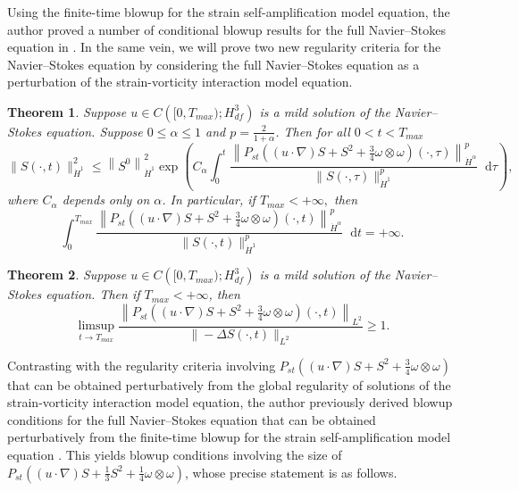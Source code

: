 \documentclass[11pt]{article}
\theoremstyle{plain}
\newtheorem{theorem}{Theorem}[section]
\theoremstyle{remark}
\numberwithin{equation}{section}
\newcommand{\diff}{\mathop{}\!\mathrm{d}}
\begin{document}
Using the finite-time blowup for the strain self-amplification model equation, the author proved a number of conditional blowup results for the full Navier--Stokes equation in \cite{MillerStrainModel}.
In the same vein, we will prove two new regularity criteria for the Navier--Stokes equation by considering the full Navier--Stokes equation as a perturbation of the strain-vorticity interaction model equation.


\begin{theorem} \label{StrainVortPerturbedRegCritIntro}
Suppose $u\in C\left([0,T_{max});H^3_{df}\right)$ is a mild solution of the Navier--Stokes equation.
Suppose $0\leq \alpha \leq 1$ and 
$p=\frac{2}{1+\alpha}$.
Then for all $0<t<T_{max}$
\begin{equation}
    \|S(\cdot,t)\|_{\dot{H}^1}^2
    \leq
    \left\|S^0 \right\|_{\dot{H}^1}^2
    \exp \left( C_\alpha \int_0^t
    \frac{\left\|P_{st}\left((u\cdot\nabla)S +S^2+\frac{3}{4}\omega\otimes\omega\right)
    (\cdot,\tau)\right\|_{\dot{H}^\alpha}^p}
    {\|S(\cdot,\tau)\|_{\dot{H}^1}^p} 
    \diff\tau \right),
\end{equation}
where $C_\alpha$ depends only on $\alpha$.
In particular, if $T_{max}<+\infty,$ then
\begin{equation}
    \int_0^{T_{max}}
    \frac{\left\|P_{st}\left((u\cdot\nabla)S +S^2+\frac{3}{4}\omega\otimes\omega\right)
    (\cdot,t)\right\|_{\dot{H}^\alpha}^p}
    {\|S(\cdot,t)\|_{\dot{H}^1}^p} \diff t 
    =+\infty.
\end{equation}
\end{theorem}



\begin{theorem} \label{EndpointRegCritIntro}
Suppose $u\in C\left([0,T_{max});H^3_{df}\right)$ is a mild solution of the Navier--Stokes equation.
Then if $T_{max}<+\infty$, then
\begin{equation}
    \limsup_{t\to T_{max}}
    \frac{\left\|P_{st}\left((u\cdot\nabla)S
    +S^2+\frac{3}{4}\omega\otimes\omega\right)
    (\cdot,t)\right\|_{L^2}}
    {\|-\Delta S(\cdot,t)\|_{L^2}} \geq 1.
\end{equation}
\end{theorem}


Contrasting with the regularity criteria involving
$P_{st}\left((u\cdot\nabla)S+S^2
+\frac{3}{4}\omega\otimes\omega\right)$
that can be obtained perturbatively from the global regularity of solutions of the strain-vorticity interaction model equation, the author previously derived blowup conditions for the full Navier--Stokes equation that can be obtained perturbatively from the finite-time blowup for the strain self-amplification model equation \cites{MillerStrainModel}. 
This yields blowup conditions involving the size of
$P_{st}\left((u\cdot\nabla)S+\frac{1}{3}S^2
+\frac{1}{4}\omega\otimes\omega\right)$,
whose precise statement is as follows.
\end{document}
